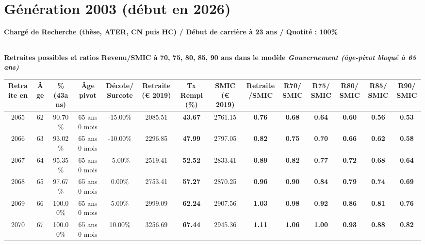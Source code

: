 \newpage 
 
\section{Génération 2003 (début en 2026)\label{CR_100_23_2003_0}} 
 
{\bf \noindent Chargé de Recherche (thèse, ATER, CN puis HC) / Début de carrière à 23 ans / Quotité : 100\%}  ~ 

 ~\\{\bf \noindent Retraites possibles et ratios Revenu/SMIC à 70, 75, 80, 85, 90 ans dans le modèle \emph{Gouvernement (âge-pivot bloqué à 65 ans)}}  
 
\begin{adjustbox}{max width=\textwidth} 
\begin{tabular}[htb]{|c|c||c|c|c||c|c||c|c||c|c|c|c|c|} 
\hline 
 Retraite en &  Âge &  \%(43ans) &  Âge pivot &  Décote/Surcote &  Retraite (\euro{} 2019) &  Tx Rempl(\%) &  SMIC (\euro{} 2019) &  Retraite/SMIC &  R70/SMIC &  R75/SMIC &  R80/SMIC &  R85/SMIC &  R90/SMIC \\ 
\hline \hline 
 2065 &  62 &  90.70\% &  65 ans 0 mois &  -15.00\% &  2085.51 &  {\bf 43.67} &  2761.15 &  {\bf {\color{red} 0.76}} &  {\bf {\color{red} 0.68}} &  {\bf {\color{red} 0.64}} &  {\bf {\color{red} 0.60}} &  {\bf {\color{red} 0.56}} &  {\bf {\color{red} 0.53}} \\ 
\hline 
 2066 &  63 &  93.02\% &  65 ans 0 mois &  -10.00\% &  2296.85 &  {\bf 47.99} &  2797.05 &  {\bf {\color{red} 0.82}} &  {\bf {\color{red} 0.75}} &  {\bf {\color{red} 0.70}} &  {\bf {\color{red} 0.66}} &  {\bf {\color{red} 0.62}} &  {\bf {\color{red} 0.58}} \\ 
\hline 
 2067 &  64 &  95.35\% &  65 ans 0 mois &  -5.00\% &  2519.41 &  {\bf 52.52} &  2833.41 &  {\bf {\color{red} 0.89}} &  {\bf {\color{red} 0.82}} &  {\bf {\color{red} 0.77}} &  {\bf {\color{red} 0.72}} &  {\bf {\color{red} 0.68}} &  {\bf {\color{red} 0.64}} \\ 
\hline 
 2068 &  65 &  97.67\% &  65 ans 0 mois &  0.00\% &  2753.41 &  {\bf 57.27} &  2870.25 &  {\bf {\color{red} 0.96}} &  {\bf {\color{red} 0.90}} &  {\bf {\color{red} 0.84}} &  {\bf {\color{red} 0.79}} &  {\bf {\color{red} 0.74}} &  {\bf {\color{red} 0.69}} \\ 
\hline 
 2069 &  66 &  100.00\% &  65 ans 0 mois &  5.00\% &  2999.09 &  {\bf 62.24} &  2907.56 &  {\bf 1.03} &  {\bf {\color{red} 0.98}} &  {\bf {\color{red} 0.92}} &  {\bf {\color{red} 0.86}} &  {\bf {\color{red} 0.81}} &  {\bf {\color{red} 0.76}} \\ 
\hline 
 2070 &  67 &  100.00\% &  65 ans 0 mois &  10.00\% &  3256.69 &  {\bf 67.44} &  2945.36 &  {\bf 1.11} &  {\bf 1.06} &  {\bf {\color{red} 1.00}} &  {\bf {\color{red} 0.93}} &  {\bf {\color{red} 0.88}} &  {\bf {\color{red} 0.82}} \\ 
\hline 
\hline 
\end{tabular} 
\end{adjustbox} 
 
